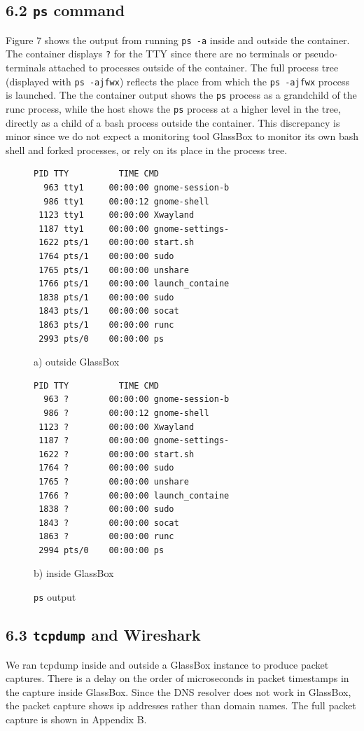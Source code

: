 \documentclass{proc}
\begin{document}
\subsection*{6.2 \texttt{ps} command}
Figure 7 shows the output from running \texttt{ps -a} inside and outside the container. The container displays \texttt{?} for the TTY since there are no terminals or pseudo-terminals attached to processes outside of the container. The full process tree (displayed with \texttt{ps -ajfwx}) reflects the place from which the \texttt{ps -ajfwx} process is launched. The the container output shows the \texttt{ps} process as a grandchild of the runc process, while the host shows the \texttt{ps} process at a higher level in the tree, directly as a child of a bash process outside the container. This discrepancy is minor since we do not expect a monitoring tool GlassBox to monitor its own bash shell and forked processes, or rely on its place in the process tree.
 \begin{figure}[h]
\begin{lstlisting}[linewidth=\linewidth]
  PID TTY          TIME CMD
  963 tty1     00:00:00 gnome-session-b
  986 tty1     00:00:12 gnome-shell
 1123 tty1     00:00:00 Xwayland
 1187 tty1     00:00:00 gnome-settings-
 1622 pts/1    00:00:00 start.sh
 1764 pts/1    00:00:00 sudo
 1765 pts/1    00:00:00 unshare
 1766 pts/1    00:00:00 launch_containe
 1838 pts/1    00:00:00 sudo
 1843 pts/1    00:00:00 socat
 1863 pts/1    00:00:00 runc
 2993 pts/0    00:00:00 ps
 \end{lstlisting}
\hspace{7.5em} a) outside GlassBox
 \begin{lstlisting}[linewidth=\linewidth]
  PID TTY          TIME CMD
  963 ?        00:00:00 gnome-session-b
  986 ?        00:00:12 gnome-shell
 1123 ?        00:00:00 Xwayland
 1187 ?        00:00:00 gnome-settings-
 1622 ?        00:00:00 start.sh
 1764 ?        00:00:00 sudo
 1765 ?        00:00:00 unshare
 1766 ?        00:00:00 launch_containe
 1838 ?        00:00:00 sudo
 1843 ?        00:00:00 socat
 1863 ?        00:00:00 runc
 2994 pts/0    00:00:00 ps
\end{lstlisting}
\hspace{7.5em} b) inside GlassBox
 \caption{\texttt{ps} output}
\end{figure}

\subsection*{6.3 \texttt{tcpdump} and Wireshark}
We ran tcpdump inside and outside a GlassBox instance to produce packet captures. There is a delay on the order of microseconds in packet timestamps in the capture inside GlassBox. Since the DNS resolver does not work in GlassBox, the packet capture shows ip addresses rather than domain names. The full packet capture is shown in Appendix B.
\end{document}
